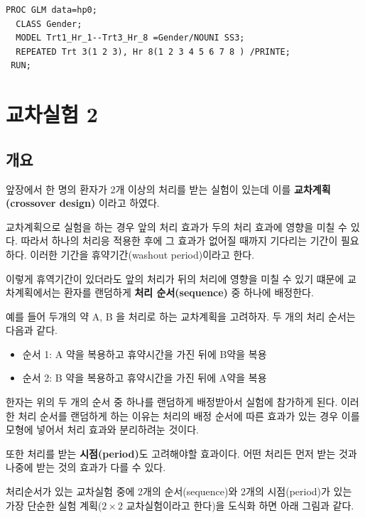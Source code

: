 \documentclass[
]{book}
\providecommand{\tightlist}{%
  \setlength{\itemsep}{0pt}\setlength{\parskip}{0pt}}
\theoremstyle{definition}
\theoremstyle{definition}
\theoremstyle{definition}
\theoremstyle{remark}
\begin{document}
\begin{verbatim}
PROC GLM data=hp0;
  CLASS Gender;
  MODEL Trt1_Hr_1--Trt3_Hr_8 =Gender/NOUNI SS3;
  REPEATED Trt 3(1 2 3), Hr 8(1 2 3 4 5 6 7 8 ) /PRINTE;
 RUN;
\end{verbatim}

\hypertarget{crossover2}{%
\chapter{교차실험 2}\label{crossover2}}

\hypertarget{uxac1cuxc694-1}{%
\section{개요}\label{uxac1cuxc694-1}}

앞장에서 한 명의 환자가 2개 이상의 처리를 받는 실험이 있는데 이를 \textbf{교차계획(crossover design)} 이라고 하였다.

교차계획으로 실험을 하는 경우 앞의 처리 효과가 두의 처리 효과에 영향을 미칠 수 있다.
따라서 하나의 처리응 적용한 후에 그 효과가 없어질 때까지 기다리는 기간이 필요하다.
이러한 기간을 휴약기간(washout period)이라고 한다.

이렇게 휴역기간이 있더라도 앞의 처리가 뒤의 처리에 영향을 미칠 수 있기 떄문에
교차계획에서는 환자를 랜덤하게 \textbf{처리 순서(sequence)} 중 하나에 배정한다.

예를 들어 두개의 약 A, B 을 처리로 하는 교차계획을 고려하자.
두 개의 처리 순서는 다음과 같다.

\begin{itemize}
\tightlist
\item
  순서 1: A 약을 복용하고 휴약시간을 가진 뒤에 B약을 복용
\item
  순서 2: B 약을 복용하고 휴약시간을 가진 뒤에 A약을 복용
\end{itemize}

한자는 위의 두 개의 순서 중 하나를 랜덤하게 배정받아서 실험에 참가하게 된다.
이러한 처리 순서를 랜덤하게 하는 이유는 처리의 배정 순서에 따른 효과가 있는 경우 이를
모형에 넣어서 처리 효과와 분리하려눈 것이다.

또한 처리를 받는 \textbf{시점(period)}도 고려해야할 효과이다. 어떤 처리든 먼저 받는 것과 나중에 받는 것의 효과가 다를 수 있다.

처리순서가 있는 교차실험 중에 2개의 순서(sequence)와 2개의 시점(period)가 있는 가장 단순한 실험 계획(\(2 \times 2\) 교차실험이라고 한다)을 도식화 하면 아래 그림과 같다.
\end{document}
